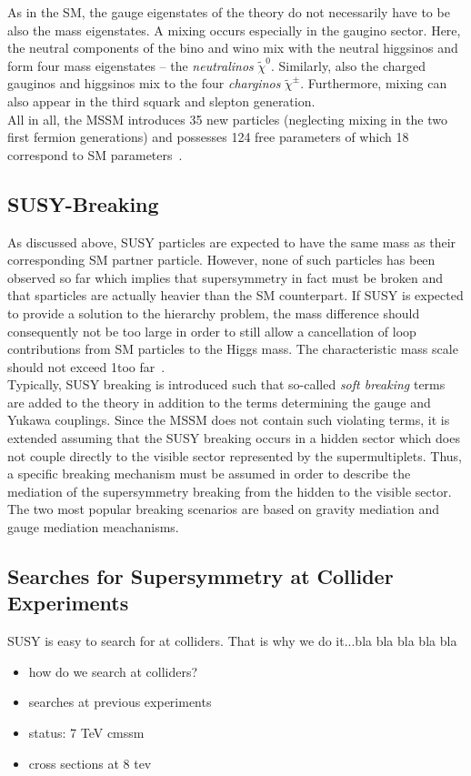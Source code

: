 As in the SM, the gauge eigenstates of the theory do not necessarily have to be also the mass eigenstates. A mixing occurs especially in the gaugino sector. Here, the neutral components of the bino and wino mix with the neutral higgsinos and form four mass eigenstates -- the \textit{neutralinos} $\tilde{\chi}^0$. Similarly, also the charged gauginos and higgsinos mix to the four \textit{charginos} $\tilde{\chi}^{\pm}$. Furthermore, mixing can also appear in the third squark and slepton generation. \\
All in all, the MSSM introduces 35 new particles (neglecting mixing in the two first fermion generations) and possesses 124 free parameters of which 18 correspond to SM parameters~\cite{bib:PDG:2012}. 
\subsection{SUSY-Breaking}
\label{subsec:susy_breaking}
As discussed above, SUSY particles are expected to have the same mass as their corresponding SM partner particle. However, none of such particles has been observed so far which implies that supersymmetry in fact must be broken and that sparticles are actually heavier than the SM counterpart. If SUSY is expected to provide a solution to the hierarchy problem, the mass difference should consequently not be too large in order to still allow a cancellation of loop contributions from SM particles to the Higgs mass. The characteristic mass scale should not exceed 1\tev too far~\cite{Martin:1997ns}. \\
Typically, SUSY breaking is introduced such that so-called \textit{soft breaking} terms are added to the theory in addition to the terms determining the gauge and Yukawa couplings. Since the MSSM does not contain such violating terms, it is extended assuming that the SUSY breaking occurs in a hidden sector which does not couple directly to the visible sector represented by the supermultiplets. Thus, a specific breaking mechanism must be assumed in order to describe the mediation of the supersymmetry breaking from the hidden to the visible sector. \\
The two most popular breaking scenarios are based on gravity mediation and gauge mediation meachanisms.   

\subsection{Searches for Supersymmetry at Collider Experiments}
\label{subsec:susy_status}
SUSY is easy to search for at colliders. That is why we do it...bla bla bla bla bla

\begin{itemize}
\item how do we search at colliders?
\item searches at previous experiments
\item status: 7 TeV cmssm
\item cross sections at 8 tev
\end{itemize}
